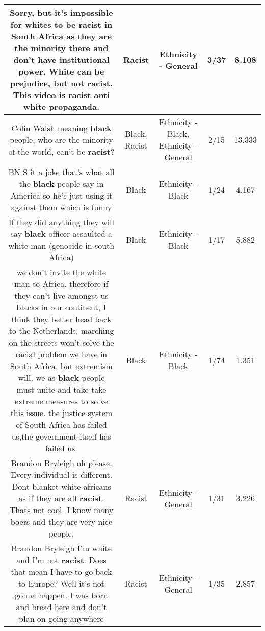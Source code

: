 \documentclass[11pt]{article}
\newlength\mylength
\begin{document}
\begin{center}
\begin{longtable}{|C{.65\mylength}|C{.30\mylength}|C{.12\mylength}|C{.12\mylength}|C{.12\mylength}|}
  \small Sorry, but it's impossible for whites to be \textbf{racist} in South Africa as they are the minority there and don't have institutional power. White can be prejudice, but not \textbf{racist}. This video is \textbf{racist} anti white propaganda.\normalsize   & Racist & Ethnicity - General & 3/37 & 8.108 \\  \hline
  \small Colin Walsh meaning \textbf{black} people, who are the minority of the world, can't be \textbf{racist}?\normalsize   & Black, Racist & Ethnicity - Black, Ethnicity - General & 2/15 & 13.333 \\  \hline
  \small BN S it a joke that's what all the \textbf{black} people say in America so he's just using it against them which is funny\normalsize   & Black & Ethnicity - Black & 1/24 & 4.167 \\  \hline
  \small If they did anything they will say \textbf{black} officer assaulted a white man (genocide in south Africa)\normalsize   & Black & Ethnicity - Black & 1/17 & 5.882 \\  \hline
  \small we don't invite the white man to Africa. therefore if they can't live amongst us blacks in our continent, I think they better head back to the Netherlands. marching on the streets won't solve the racial problem we have in South Africa, but extremism will. we as \textbf{black} people must unite and take take extreme measures to solve this issue. the justice system of South Africa has failed us,the government itself has failed us.\normalsize   & Black & Ethnicity - Black & 1/74 & 1.351 \\  \hline
  \small Brandon Bryleigh oh please. Every individual is different. Dont blanket white africans as if they are all \textbf{racist}. Thats not cool. I know many boers and they are very nice people.\normalsize   & Racist & Ethnicity - General & 1/31 & 3.226 \\  \hline
  \small Brandon Bryleigh I'm white and I'm not \textbf{racist}. Does that mean I have to go back to Europe? Well it's not gonna happen. I was born and bread here and don't plan on going anywhere\normalsize   & Racist & Ethnicity - General & 1/35 & 2.857 \\  \hline

\end{longtable}
\end{center}
\end{document}
